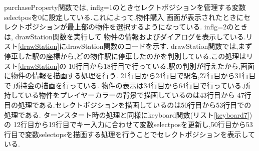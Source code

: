\documentclass[a4j]{jarticle}
\begin{document}
    purchaseProperty関数では, inflg=1のときセレクトポジションを管理する変数selectposを0に設定している.これによって,物件購入
    画面が表示されたときにセレクトポジションが最上部の物件を選択するようになっている. inflg=2のときは, drawStation関数を実行して
    物件の情報およびダイアログを表示している.リスト\ref{drawStation}にdrawStation関数のコードを示す.
    drawStation関数では,まず停車した駅の座標から,どの物件駅に停車したのかを判別している.この処理はリスト\ref{drawStation}の
    10行目から18行目で行っている.駅の判別が行えたから,画面に物件の情報を描画する処理を行う. 21行目から24行目で駅名,27行目から31行目で
    所持金の描画を行っている. 物件の表示は34行目から64行目で行っている.所持している物件をプレイヤーカラーの背景で描画しているのは43行目から
    47行目の処理である.セレクトポジションを描画しているのは50行目から53行目での処理である. ターンスタート時の処理と同様にkeyboard関数(リスト\ref{keyboard7})の
    12行目から19行目でキー入力に合わせて変数selectposを更新し,50行目から53行目で変数selectopsを描画する処理を行うことでセレクトポジションを表示している.\\
    
\end{document}
